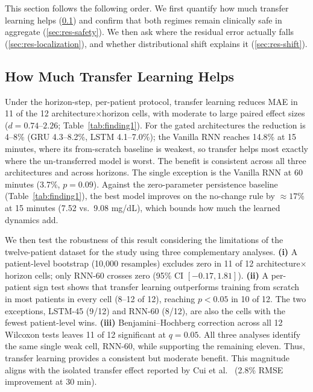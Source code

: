 \documentclass[conference]{IEEEtran}
\begin{document}
This section follows the following order. We first quantify how
much transfer learning helps (\ref{sec:res-tl}) and confirm that both regimes
remain clinically safe in aggregate (\ref{sec:res-safety}). We then ask where the
residual error actually falls (\ref{sec:res-localization}), and whether
distributional shift explains it (\ref{sec:res-shift}). 

\subsection{How Much Transfer Learning Helps}
\label{sec:res-tl}
Under the horizon-step, per-patient protocol, transfer learning reduces MAE in 11
of the 12 architecture$\times$horizon cells, with moderate to large paired effect
sizes ($d=0.74$--$2.26$; Table~\ref{tab:finding1}). For the gated architectures the
reduction is 4--8\% (GRU 4.3--8.2\%, LSTM 4.1--7.0\%); the Vanilla RNN reaches
14.8\% at 15 minutes, where its from-scratch baseline is weakest, so transfer helps
most exactly where the un-transferred model is worst. The benefit is consistent
across all three architectures and across horizons. The single exception is the
Vanilla RNN at 60 minutes (3.7\%, $p=0.09$). Against the zero-parameter persistence
baseline (Table~\ref{tab:finding1}), the best model improves on the no-change rule
by ${\approx}17\%$ at 15 minutes (7.52 vs.\ 9.08 mg/dL), which bounds how much the
learned dynamics add.


We then test the robustness of this result considering the limitations of the twelve-patient dataset for the study using three complementary analyses. \textbf{(i)} A patient-level bootstrap (10,000 resamples) excludes zero in 11 of 12 architecture$\times$horizon cells; only RNN-60 crosses zero (95\% CI $[-0.17,1.81]$). \textbf{(ii)} A per-patient sign test shows that transfer learning outperforms training from scratch in most patients in every cell (8--12 of 12), reaching $p<0.05$ in 10 of 12. The two exceptions, LSTM-45 (9/12) and RNN-60 (8/12), are also the cells with the fewest patient-level wins. \textbf{(iii)} Benjamini--Hochberg correction across all 12 Wilcoxon tests leaves 11 of 12 significant at $q=0.05$. All three analyses identify the same single weak cell, RNN-60, while supporting the remaining eleven. Thus, transfer learning provides a consistent but moderate benefit. This magnitude aligns with the isolated transfer effect reported by Cui et al.~\cite{CUI9474665} (2.8\% RMSE improvement at 30 min).
\end{document}
